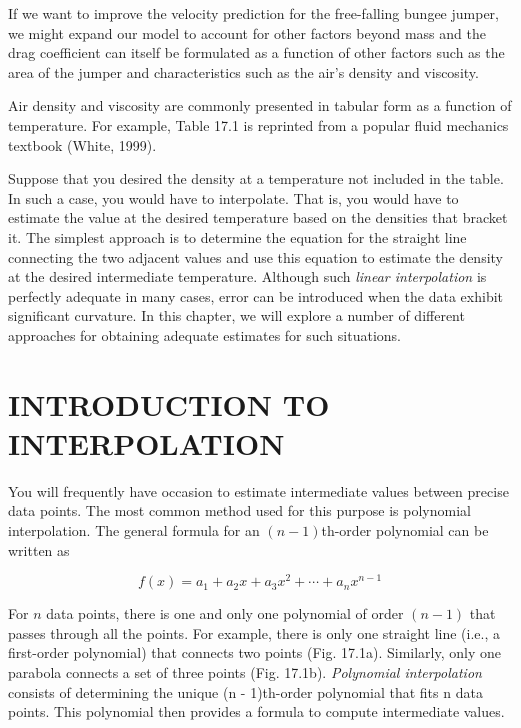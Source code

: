 \documentclass[../main.tex]{subfiles}
\begin{document}

If we want to improve the velocity prediction for the free-falling bungee jumper, we might expand our model to account for other factors beyond mass and the drag coefficient can itself be formulated as a function of other factors such as the area of the jumper and characteristics such as the air's density and viscosity.

Air density and viscosity are commonly presented in tabular form as a function of
temperature. For example, Table 17.1 is reprinted from a popular fluid mechanics textbook
(White, 1999).

Suppose that you desired the density at a temperature not included in the table. In such
a case, you would have to interpolate. That is, you would have to estimate the value at the desired temperature based on the densities that bracket it. The simplest approach is to determine the equation for the straight line connecting the two adjacent values and use this
equation to estimate the density at the desired intermediate temperature. Although such
\textit{linear interpolation} is perfectly adequate in many cases, error can be introduced when the
data exhibit significant curvature. In this chapter, we will explore a number of different
approaches for obtaining adequate estimates for such situations.


\label{cha:cha_P_17_1} %
\section{INTRODUCTION TO INTERPOLATION}

\noindent You will frequently have occasion to estimate intermediate values between precise data
points. The most common method used for this purpose is polynomial interpolation. The
general formula for an $(n - 1)$th-order polynomial can be written as

\begin{equation}
	\tag{17.1}
	f(x) = a_1 + a_2 x + a_3 x^2 + \cdots + a_n x^{n-1}
\end{equation}

For $n$ data points, there is one and only one polynomial of order $(n - 1)$ that passes through
all the points. For example, there is only one straight line (i.e., a first-order polynomial)
that connects two points (Fig. 17.1a). Similarly, only one parabola connects a set of three
points (Fig. 17.1b). \textit{Polynomial interpolation} consists of determining the unique (n - 1)th-order polynomial that fits n data points. This polynomial then provides a formula to
compute intermediate values.
\end{document}
